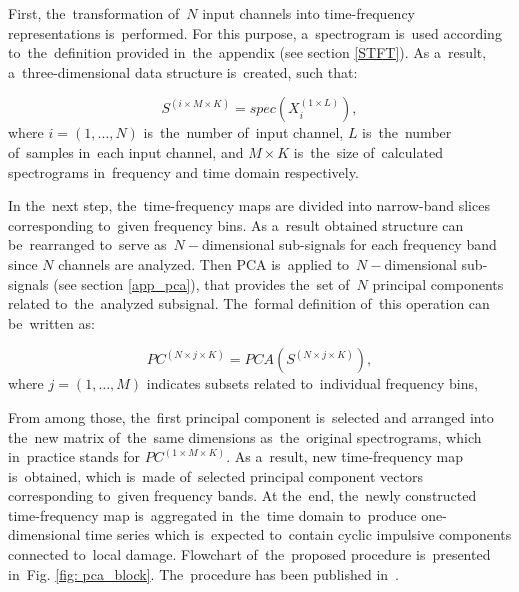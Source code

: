 First, the~transformation of~$N$ input channels into time-frequency representations is~performed. For this purpose, a~spectrogram is~used according to~the~definition provided in~the~appendix (see section \ref{STFT}). As a~result, a~three-dimensional data structure is~created, such that:

\begin{equation}
  S^{(i\times M\times K)}=spec\left(X_i^{(1\times L)} \right),
\end{equation}
where $i=(1,\dots,N)$ is~the~number of~input channel, $L$ is~the~number of~samples in~each input channel, and $M\times K$ is~the~size of~calculated spectrograms in~frequency and time domain respectively.

In the~next step, the~time-frequency maps are divided into narrow-band slices corresponding to~given frequency bins. As a~result obtained structure can be~rearranged to~serve as~$N-$dimensional sub-signals for each frequency band since $N$ channels are analyzed. Then PCA is~applied to~$N-$dimensional sub-signals (see section \ref{app_pca}), that provides the~set of~$N$ principal components related to~the~analyzed subsignal. The~formal definition of~this operation can be~written as:

\begin{equation}
  PC^{(N\times j\times K)}=PCA\left(S^{(N\times j\times K)} \right),
\end{equation}
where $j=(1,\dots,M)$ indicates subsets related to~individual frequency bins, 


From among those, the~first principal component is~selected and arranged into the~new matrix of~the~same dimensions as~the~original spectrograms, which in~practice stands for $PC^{(1\times M\times K)}$. As a~result, new time-frequency map is~obtained, which is~made of~selected principal component vectors corresponding to~given frequency bands. At the~end, the~newly constructed time-frequency map is~aggregated in~the~time domain to~produce one-dimensional time series which is~expected to~contain cyclic impulsive components connected to~local damage. Flowchart of~the~proposed procedure is~presented in~Fig. \ref{fig: pca_block}. The~procedure has been published in~\cite{wodecki2016combination}.


